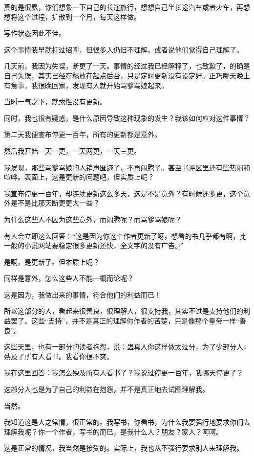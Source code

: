 \begin{this_body}
真的是很累，你们想象一下自己的长途旅行，想想自己坐长途汽车或者火车，再想想将这个过程，扩散到一个月，每天这样做。

写作状态因此不佳。

这个事情我早就打过招呼，但很多人仍旧不理解。或者说他们觉得自己理解了。

几天前，我因为失误，断更了一天。事情的经过我已经解释了，也致歉了，的确是自己失误，其实已经存稿放在起点后台，只是定时更新没有设定好。正巧哪天晚上有急事，我很晚回家，发现有人就开始骂爹骂娘起来。

当时一气之下，就索性没有更新。

同时，我也很有疑惑，是什么原因导致这种现象的发生？我该如何应对这件事情？

第二天我便宣布停更一百年，所有的更新都是意外。

然后我开始一天一更，一天两更，一天三更。

我发现，那些骂爹骂娘的人销声匿迹了，不再闹腾了。甚至书评区里还有些热闹和喧哗。表面上，这是更新的问题吧，但实质上呢？

我宣布停更一百年，却连续更新这么多天，这是不是意外？有时候还多更，这个意外是不是比那天断更更大一些？

为什么这些人不因为这些意外，而闹腾呢？而骂爹骂娘呢？

有人会立即这么回答：“这是因为你这个作者更新了呀。想看的书几乎都有啊，比一般的小说网站要稳定很多更新还快，全文字的没有广告。]”

是啊，是更新了。但本质上呢？

同样是意外，怎么这些人不能一概而论呢？

这是因为，我做出来的事情，符合他们的利益而已！

所以这部分的人，看起来很善良，很理解人，很支持我，其实不过是支持他们的利益罢了。这些“支持”，并不是真正的理解你作者的苦楚，只是像那个皇帝一样“善良”。

这些天里，也有一部分的读者抱怨，说：蛊真人你这样做太过分，为了少部分人，殃及了所有人看书。我看你很不爽。

我在这里回答：我怎么殃及所有人看书了？我说过停更一百年，我哪天停更了？

这部分人也是为了自己的利益在抱怨，并不是真正地去试图理解我。

当然。

我知道这是人之常情，很正常的。我写书，你看书，为什么我要强行地要求你们去理解我呢？你一个作者，写书的而已，是我什么人？朋友？家人？呵呵。

这是正常的情况，我当然是接受的。实际上，我也从不强行要求别人来理解我。


\end{this_body}
